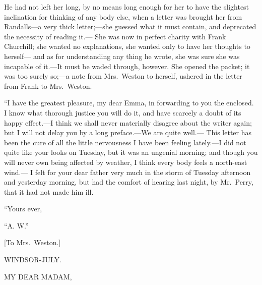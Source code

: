 He had not left her long, by no means long enough for her to have
the slightest inclination for thinking of any body else, when a letter
was brought her from Randalls---a very thick letter;---she guessed
what it must contain, and deprecated the necessity of reading it.---%
She was now in perfect charity with Frank Churchill; she wanted
no explanations, she wanted only to have her thoughts to herself---%
and as for understanding any thing he wrote, she was sure she was
incapable of it.---It must be waded through, however.  She opened
the packet; it was too surely so;---a note from Mrs.\ Weston to herself,
ushered in the letter from Frank to Mrs.\ Weston.

``I have the greatest pleasure, my dear Emma, in forwarding
to you the enclosed.  I know what thorough justice you will
do it, and have scarcely a doubt of its happy effect.---I think
we shall never materially disagree about the writer again;
but I will not delay you by a long preface.---We are quite well.---%
This letter has been the cure of all the little nervousness I have
been feeling lately.---I did not quite like your looks on Tuesday,
but it was an ungenial morning; and though you will never own being
affected by weather, I think every body feels a north-east wind.---%
I felt for your dear father very much in the storm of Tuesday
afternoon and yesterday morning, but had the comfort of hearing
last night, by Mr.\ Perry, that it had not made him ill.

                              ``Yours ever,

                                                       ``A. W.''

                       [To Mrs.\ Weston.]

                                                       WINDSOR-JULY.

MY DEAR MADAM,

